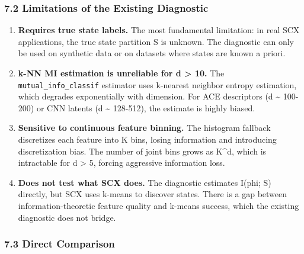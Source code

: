 \documentclass[
  12pt,
]{article}
\begin{document}
\subsubsection{7.2 Limitations of the Existing
Diagnostic}\label{limitations-of-the-existing-diagnostic}

\begin{enumerate}
\def\labelenumi{\arabic{enumi}.}
\item
  \textbf{Requires true state labels.} The most fundamental limitation:
  in real SCX applications, the true state partition S is unknown. The
  diagnostic can only be used on synthetic data or on datasets where
  states are known a priori.
\item
  \textbf{k-NN MI estimation is unreliable for d \textgreater{} 10.} The
  \texttt{mutual\_info\_classif} estimator uses k-nearest neighbor
  entropy estimation, which degrades exponentially with dimension. For
  ACE descriptors (d \textasciitilde{} 100-200) or CNN latents (d
  \textasciitilde{} 128-512), the estimate is highly biased.
\item
  \textbf{Sensitive to continuous feature binning.} The histogram
  fallback discretizes each feature into K bins, losing information and
  introducing discretization bias. The number of joint bins grows as
  K\^{}d, which is intractable for d \textgreater{} 5, forcing
  aggressive information loss.
\item
  \textbf{Does not test what SCX does.} The diagnostic estimates I(phi;
  S) directly, but SCX uses k-means to discover states. There is a gap
  between information-theoretic feature quality and k-means success,
  which the existing diagnostic does not bridge.
\end{enumerate}

\subsubsection{7.3 Direct Comparison}\label{direct-comparison}
\end{document}
